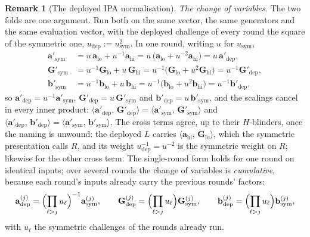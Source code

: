 \documentclass[11pt,a4paper]{article}
\theoremstyle{definition}
\newtheorem{remark}[theorem]{Remark}
\newcommand{\ip}[2]{\langle #1,\, #2 \rangle}
\begin{document}
\begin{remark}[The deployed IPA normalisation]
\emph{The change of variables.} The two folds are one argument. Run
both on the same vector, the same generators and the same evaluation
vector, with the deployed challenge of every round the square of the
symmetric one, $u_{\mathrm{dep}} := u_{\mathrm{sym}}^{2}$. In one
round, writing $u$ for $u_{\mathrm{sym}}$,
\begin{align*}
\mathbf a'_{\mathrm{sym}}
 &= u\,\mathbf a_{\mathrm{lo}} + u^{-1}\mathbf a_{\mathrm{hi}}
  = u\,\bigl(\mathbf a_{\mathrm{lo}} + u^{-2}\mathbf a_{\mathrm{hi}}\bigr)
  = u\,\mathbf a'_{\mathrm{dep}}, \\
\mathbf G'_{\mathrm{sym}}
 &= u^{-1}\mathbf G_{\mathrm{lo}} + u\,\mathbf G_{\mathrm{hi}}
  = u^{-1}\bigl(\mathbf G_{\mathrm{lo}} + u^{2}\mathbf G_{\mathrm{hi}}\bigr)
  = u^{-1}\mathbf G'_{\mathrm{dep}}, \\
\mathbf b'_{\mathrm{sym}}
 &= u^{-1}\mathbf b_{\mathrm{lo}} + u\,\mathbf b_{\mathrm{hi}}
  = u^{-1}\bigl(\mathbf b_{\mathrm{lo}} + u^{2}\mathbf b_{\mathrm{hi}}\bigr)
  = u^{-1}\mathbf b'_{\mathrm{dep}},
\end{align*}
so $\mathbf a'_{\mathrm{dep}} = u^{-1}\mathbf a'_{\mathrm{sym}}$,
$\mathbf G'_{\mathrm{dep}} = u\,\mathbf G'_{\mathrm{sym}}$ and
$\mathbf b'_{\mathrm{dep}} = u\,\mathbf b'_{\mathrm{sym}}$, and the
scalings cancel in every inner product:
$\ip{\mathbf a'_{\mathrm{dep}}}{\mathbf G'_{\mathrm{dep}}} =
\ip{\mathbf a'_{\mathrm{sym}}}{\mathbf G'_{\mathrm{sym}}}$ and
$\ip{\mathbf a'_{\mathrm{dep}}}{\mathbf b'_{\mathrm{dep}}} =
\ip{\mathbf a'_{\mathrm{sym}}}{\mathbf b'_{\mathrm{sym}}}$. The cross
terms agree, up to their $H$-blinders, once the naming is unwound: the
deployed $L$ carries
$\ip{\mathbf a_{\mathrm{hi}}}{\mathbf G_{\mathrm{lo}}}$, which the
symmetric presentation calls $R$, and its weight $u_{\mathrm{dep}}^{-1}
= u^{-2}$ is the symmetric weight on $R$; likewise for the other cross
term. The single-round form holds for one round on identical inputs;
over several rounds the change of variables is \emph{cumulative},
because each round's inputs already carry the previous rounds'
factors:
\begin{equation}\label{eq:ipa-cumulative}
\mathbf a^{(j)}_{\mathrm{dep}}
 = \Bigl(\prod_{\ell > j} u_\ell\Bigr)^{-1}\mathbf a^{(j)}_{\mathrm{sym}},
\qquad
\mathbf G^{(j)}_{\mathrm{dep}}
 = \Bigl(\prod_{\ell > j} u_\ell\Bigr)\mathbf G^{(j)}_{\mathrm{sym}},
\qquad
\mathbf b^{(j)}_{\mathrm{dep}}
 = \Bigl(\prod_{\ell > j} u_\ell\Bigr)\mathbf b^{(j)}_{\mathrm{sym}},
\end{equation}
with $u_\ell$ the symmetric challenges of the rounds already run.

\end{remark}
\end{document}
